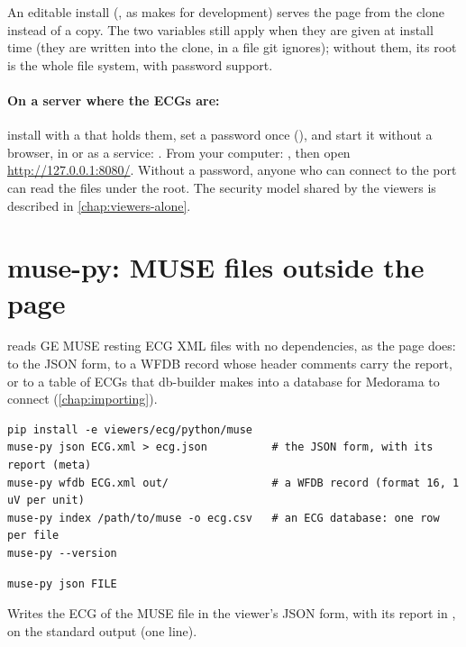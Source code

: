 An editable install (, as  makes for development) serves the
page from the clone instead of a copy. The two variables still apply when they are given at
install time (they are written into the clone, in a file git ignores); without them, its root is
the whole file system, with password support.

\paragraph{On a server where the ECGs are:} install with a  that holds them,
set a password once (), and start it without a browser, in
 or as a service: . From your
computer: , then open
\url{http://127.0.0.1:8080/}. Without a password, anyone who can connect to the port can read the
files under the root. The security model shared by the viewers is described in
\cref{chap:viewers-alone}.

\section{muse-py: MUSE files outside the page}
\label{sec:ecg-viewer-muse-py}

 reads GE MUSE resting ECG XML files with no dependencies, as the page does: to the
JSON form, to a WFDB record whose header comments carry the report, or to a table of ECGs that
db-builder makes into a database for Medorama to connect (\cref{chap:importing}).

\begin{lstlisting}[style=shell]
pip install -e viewers/ecg/python/muse
muse-py json ECG.xml > ecg.json          # the JSON form, with its report (meta)
muse-py wfdb ECG.xml out/                # a WFDB record (format 16, 1 uV per unit)
muse-py index /path/to/muse -o ecg.csv   # an ECG database: one row per file
muse-py --version
\end{lstlisting}

\begin{lstlisting}[style=signature]
muse-py json FILE
\end{lstlisting}
Writes the ECG of the MUSE file  in the viewer's JSON form, with its report in
, on the standard output (one line).

